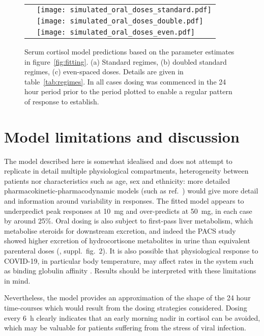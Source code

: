 \documentclass[12pt,a4paper]{article}
\begin{document}
\begin{figure}
    \centering
    \begin{tabular}{ll}
    \raisebox{7cm}{(a)} & 
    \texttt{[image: simulated\_oral\_doses\_standard.pdf]} \\
    \raisebox{7cm}{(b)} & 
    \texttt{[image: simulated\_oral\_doses\_double.pdf]} \\
    \raisebox{7cm}{(c)} & 
    \texttt{[image: simulated\_oral\_doses\_even.pdf]}
    \end{tabular}
    \caption{Serum cortisol model predictions based on the parameter estimates in figure~\ref{fig:fitting}. (a) Standard regimes, (b) doubled standard regimes, (c) even-spaced doses. Details are given in table~\ref{tab:regimes}. In all cases dosing was commenced in the 24 hour period prior to the period plotted to enable a regular pattern of response to establish.}
    \label{fig:predictions}
\end{figure}

\section*{Model limitations and discussion}
The model described here is somewhat idealised and does not attempt to replicate in detail multiple physiological compartments, heterogeneity between patients nor characteristics such as age, sex and ethnicity: more detailed pharmacokinetic-pharmacodynamic models (such as ref.\ \cite{melin2018}) would give more detail and information around variability in responses. The fitted model appears to underpredict peak responses at 10~mg and over-predicts at 50~mg, in each case by around 25\%. Oral dosing is also subject to first-pass liver metabolism, which metabolise steroids for downstream excretion, and indeed the PACS study showed higher excretion of hydrocortisone metabolites in urine than equivalent parenteral doses (\cite{prete2020}, suppl.\ fig.\ 2). 
It is also possible that physiological response to COVID-19, in particular body temperature, may affect rates in the system such as binding globulin affinity \cite{chan2013}. Results should be interpreted with these limitations in mind.

Nevertheless, the model provides an approximation of the shape of the 24 hour time-courses which would result from the dosing strategies considered. Dosing every 6~h clearly indicates that an early morning nadir in cortisol can be avoided, which may be valuable for patients suffering from the stress of viral infection.
\end{document}

